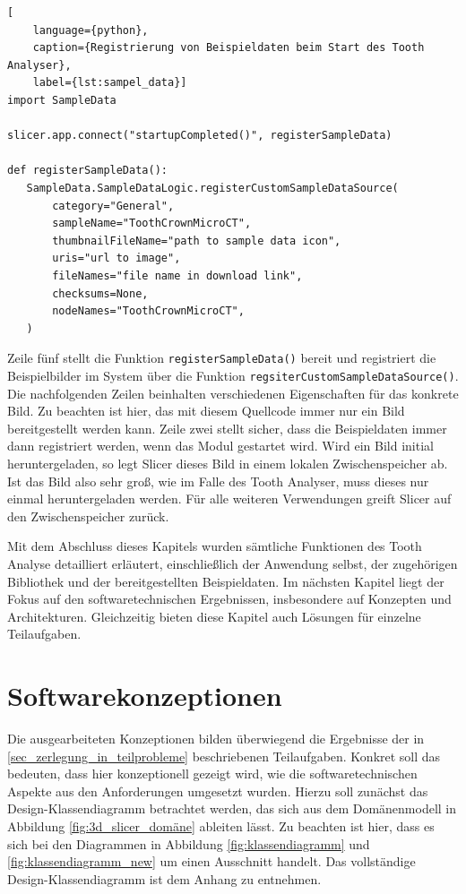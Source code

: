 \begin{lstlisting}[
    language={python},
    caption={Registrierung von Beispieldaten beim Start des Tooth Analyser},
    label={lst:sampel_data}]
import SampleData

slicer.app.connect("startupCompleted()", registerSampleData)

def registerSampleData():
   SampleData.SampleDataLogic.registerCustomSampleDataSource(
	   category="General",
	   sampleName="ToothCrownMicroCT",
	   thumbnailFileName="path to sample data icon",
	   uris="url to image",
	   fileNames="file name in download link",
	   checksums=None,
	   nodeNames="ToothCrownMicroCT",
   )
\end{lstlisting}

Zeile fünf stellt die Funktion \texttt{registerSampleData()} bereit und registriert die Beispielbilder im System
über die Funktion \texttt{regsiterCustomSampleDataSource()}. Die nachfolgenden Zeilen
beinhalten verschiedenen Eigenschaften für das konkrete Bild. Zu beachten ist
hier, das mit diesem Quellcode immer nur ein Bild bereitgestellt werden kann.
Zeile zwei stellt sicher, dass die Beispieldaten immer dann registriert werden,
wenn das Modul gestartet wird. Wird ein Bild initial heruntergeladen, so legt
Slicer dieses Bild in einem lokalen Zwischenspeicher ab. Ist das Bild also sehr groß,
wie im Falle des Tooth Analyser, muss dieses nur einmal heruntergeladen werden.
Für alle weiteren Verwendungen greift Slicer auf den Zwischenspeicher zurück.

Mit dem Abschluss dieses Kapitels wurden sämtliche Funktionen des Tooth Analyse
detailliert erläutert, einschließlich der Anwendung selbst, der zugehörigen
Bibliothek und der bereitgestellten Beispieldaten. Im nächsten Kapitel liegt der
Fokus auf den softwaretechnischen Ergebnissen, insbesondere auf Konzepten und
Architekturen. Gleichzeitig bieten diese Kapitel auch Lösungen für einzelne Teilaufgaben.

\pagebreak

\section{Softwarekonzeptionen}
\label{sec:konzeptionen} Die ausgearbeiteten Konzeptionen bilden überwiegend die
Ergebnisse der in \ref{sec_zerlegung_in_teilprobleme} beschriebenen Teilaufgaben.
Konkret soll das bedeuten, dass hier konzeptionell gezeigt wird, wie die softwaretechnischen
Aspekte aus den Anforderungen umgesetzt wurden. Hierzu soll zunächst das Design-Klassendiagramm
betrachtet werden, das sich aus dem Domänenmodell in Abbildung \ref{fig:3d_slicer_domäne}
ableiten lässt. Zu beachten ist hier, dass es sich bei den Diagrammen in Abbildung
\ref{fig:klassendiagramm} und \ref{fig:klassendiagramm_new} um einen Ausschnitt handelt.
Das vollständige Design-Klassendiagramm ist dem Anhang zu entnehmen.

